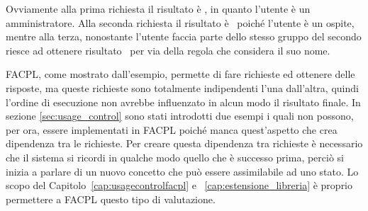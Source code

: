 Ovviamente alla prima richiesta il risultato è \permit, in quanto l'utente è un amministratore. Alla seconda richiesta il risultato è \deny \ poiché l'utente è un ospite, mentre alla terza, nonostante l'utente faccia parte dello stesso gruppo del secondo riesce ad ottenere risultato \permit \ per via della regola che considera il suo nome.\\ \par
FACPL, come mostrato dall'esempio, permette di fare richieste ed ottenere delle risposte, ma queste richieste sono totalmente indipendenti l'una dall'altra, quindi l'ordine di esecuzione non avrebbe influenzato in alcun modo il risultato finale.
In sezione \ref{sec:usage_control} sono stati introdotti due esempi i quali non possono, per ora, essere implementati in FACPL poiché manca quest'aspetto che crea dipendenza tra le richieste.
Per creare questa dipendenza tra richieste è necessario che il sistema si ricordi in qualche modo quello che è successo prima, perciò si inizia a parlare di un nuovo concetto che può essere assimilabile ad uno stato. Lo scopo del Capitolo~\ref{cap:usagecontrolfacpl} e ~\ref{cap:estensione_libreria} è proprio permettere a FACPL questo tipo di valutazione.

